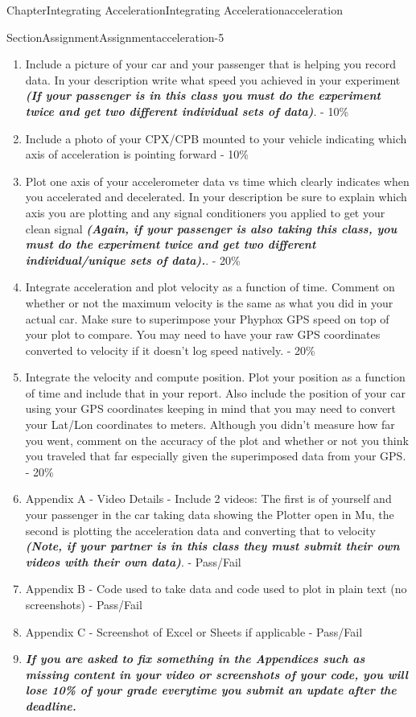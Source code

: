 \documentclass[oneside,10pt,]{book}
\newcommand{\alert}[1]{\textbf{\textit{#1}}}
\numberwithin{equation}{section}
\begin{document}
\begin{chapterptx}{Chapter}{Integrating Acceleration}{}{Integrating Acceleration}{}{}{acceleration}
\begin{sectionptx}{Section}{Assignment}{}{Assignment}{}{}{acceleration-5}
\begin{introduction}{}
\begin{enumerate}
\item{}Include a picture of your car and your passenger that is helping you record data. In your description write what speed you achieved in your experiment \alert{(If your passenger is in this class you must do the experiment twice and get two different individual sets of data)}. - 10\%%
\item{}Include a photo of your CPX\slash{}CPB mounted to your vehicle indicating which axis of acceleration is pointing forward - 10\%%
\item{}Plot one axis of your accelerometer data vs time which clearly indicates when you accelerated and decelerated. In your description be sure to explain which axis you are plotting and any signal conditioners you applied to get your clean signal \alert{(Again, if your passenger is also taking this class, you must do the experiment twice and get two different individual\slash{}unique sets of data).}. - 20\%%
\item{}Integrate acceleration and plot velocity as a function of time. Comment on whether or not the maximum velocity is the same as what you did in your actual car. Make sure to superimpose your Phyphox GPS speed on top of your plot to compare. You may need to have your raw GPS coordinates converted to velocity if it doesn't log speed natively. - 20\%%
\item{}Integrate the velocity and compute position. Plot your position as a function of time and include that in your report. Also include the position of your car using your GPS coordinates keeping in mind that you may need to convert your Lat\slash{}Lon coordinates to meters. Although you didn't measure how far you went, comment on the accuracy of the plot and whether or not you think you traveled that far especially given the superimposed data from your GPS. - 20\%%
\item{}Appendix A - Video Details - Include 2 videos: The first is of yourself and your passenger in the car taking data showing the Plotter open in Mu, the second is plotting the acceleration data and converting that to velocity \alert{(Note, if your partner is in this class they must submit their own videos with their own data)}. - Pass\slash{}Fail%
\item{}Appendix B - Code used to take data and code used to plot in plain text (no screenshots) - Pass\slash{}Fail%
\item{}Appendix C - Screenshot of Excel or Sheets if applicable - Pass\slash{}Fail%
\item{}\alert{If you are asked to fix something in the Appendices such as missing content in your video or screenshots of your code, you will lose 10\% of your grade everytime you submit an update after the deadline.}%
\end{enumerate}
%
\end{introduction}%
\end{sectionptx}
\end{chapterptx}
\end{document}
